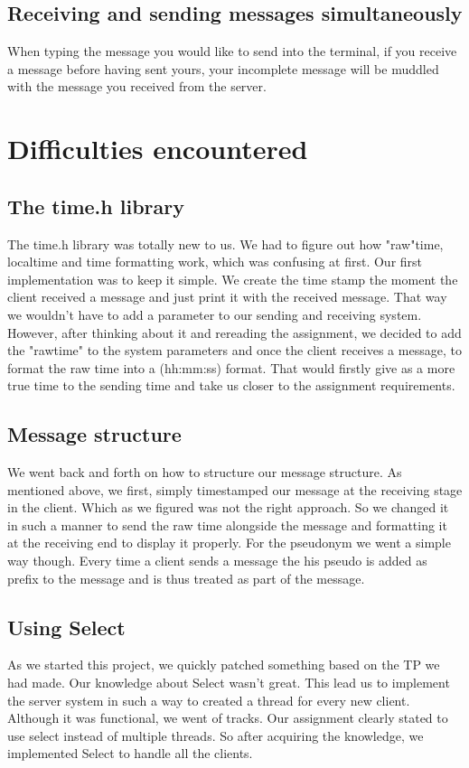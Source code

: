 \documentclass{article}
\begin{document}
\subsection{Receiving and sending messages simultaneously}
When typing the message you would like to send into the terminal, if you receive a message before having sent yours, your incomplete message will be muddled with the message you received from the server.

\section{Difficulties encountered}

\subsection{The time.h library}

The time.h library was totally new to us. We had to figure out how "raw"time, localtime and time formatting work, which was confusing at first. Our first implementation was to keep it simple. We create the time stamp the moment the client received a message and just print it with the received message. That way we wouldn't have to add a parameter to our sending and receiving system.
However, after thinking about it and rereading the assignment, we decided to add the "rawtime" to the system parameters and once the client receives a message, to format the raw time into a (hh:mm:ss) format.
That would firstly give as a more true time to the sending time and take us closer to the assignment requirements.

\subsection{Message structure}
We went back and forth on how to structure our message structure. As mentioned above, we first, simply timestamped our message at the receiving stage in the client. Which as we figured was not the right approach. So we changed it in such a manner to send the raw time alongside the message and formatting it at the receiving end to display it properly.
For the pseudonym we went a simple way though. Every time a client sends a message the his pseudo is added as prefix to the message and is thus treated as part of the message.

\newpage

\subsection{Using Select}
As we started this project, we quickly patched something based on the TP we had made. Our knowledge about Select wasn't great. This lead us to implement the server system in such a way to created a thread for every new client. Although it was functional, we went of tracks. Our assignment clearly stated to use select instead of multiple threads. So after acquiring the knowledge, we implemented Select to handle all the clients.  
\end{document}

